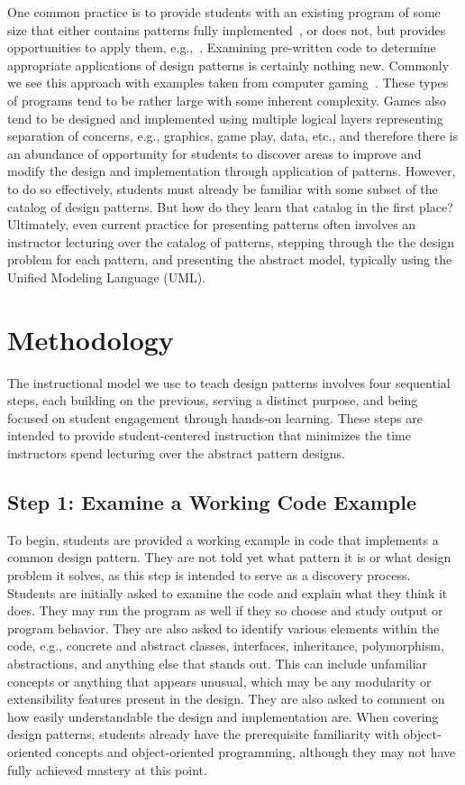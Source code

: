 \documentclass[conference]{IEEEtran}
\begin{document}
One common practice is to provide students with an existing program of some size that either contains patterns fully implemented~\cite{chimalakonda2018}, or does not, but provides opportunities to apply them, e.g.,~\cite{carrington2018}. Examining pre-written code to determine appropriate applications of design patterns is certainly nothing new. Commonly we see this approach with examples taken from computer gaming~\cite{gestwicki2008, healy2023, vahldick2026}. These types of programs tend to be rather large with some inherent complexity. Games also tend to be designed and implemented using multiple logical layers representing separation of concerns, e.g., graphics, game play, data, etc., and therefore there is an abundance of opportunity for students to discover areas to improve and modify the design and implementation through application of patterns. However, to do so effectively, students must already be familiar with some subset of the catalog of design patterns. But how do they learn that catalog in the first place? Ultimately, even current practice for presenting patterns often involves an instructor lecturing over the catalog of patterns, stepping through the the design problem for each pattern, and presenting the abstract model, typically using the Unified Modeling Language (UML).

\section{Methodology}

The instructional model we use to teach design patterns involves four sequential steps, each building on the previous, serving a distinct purpose, and being focused on student engagement through hands-on learning. These steps are intended to provide student-centered instruction that minimizes the time instructors spend lecturing over the abstract pattern designs.

\subsection{Step 1: Examine a Working Code Example}

To begin, students are provided a working example in code that implements a common design pattern. They are not told yet what pattern it is or what design problem it solves, as this step is intended to serve as a discovery process. Students are initially asked to examine the code and explain what they think it does. They may run the program as well if they so choose and study output or program behavior. They are also asked to identify various elements within the code, e.g., concrete and abstract classes, interfaces, inheritance, polymorphism, abstractions, and anything else that stands out. This can include unfamiliar concepts or anything that appears unusual, which may be any modularity or extensibility features present in the design. They are also asked to comment on how easily understandable the design and implementation are. When covering design patterns, students already have the prerequisite familiarity with object-oriented concepts and object-oriented programming, although they may not have fully achieved mastery at this point.
\end{document}
